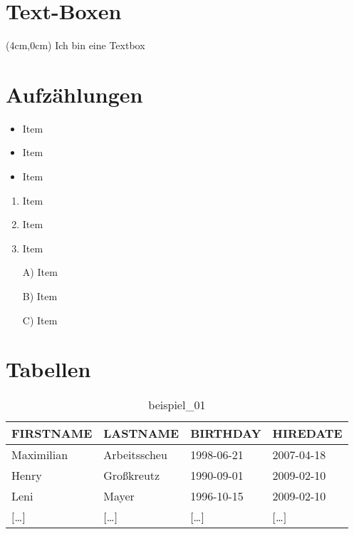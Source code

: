 \section{Text-Boxen}
\begin{textblock*}{\textwidth}(4cm,0cm)
  Ich bin eine Textbox
\end{textblock*}


\section{Aufzählungen}
\begin{itemize}[itemsep=0pt]
  \item Item
  \item Item
  \item Item
\end{itemize}

\begin{enumerate}[itemsep=0pt]
  \item Item
  \item Item
  \item Item
\end{enumerate}

\begin{itemize}[itemsep=0pt]
  \item[A)] Item
  \item[B)] Item
  \item[C)] Item
\end{itemize}

\section{Tabellen}

\begin{table}[H]
  \begin{tabularx}{\textwidth}{X|X|X|X}
    \textbf{FIRSTNAME} & \textbf{LASTNAME} & \textbf{BIRTHDAY} & \textbf{HIREDATE} \\
    \hline\hline
    Maximilian & Arbeitsscheu & 1998-06-21 & 2007-04-18 \\
    Henry & Großkreutz & 1990-09-01 & 2009-02-10 \\
    Leni & Mayer & 1996-10-15 & 2009-02-10 \\
    $[$\dots$]$ & $[$\dots$]$ & $[$\dots$]$ & $[$\dots$]$ \\
  \end{tabularx}
  \caption{beispiel\_01}
  \label{tbl:beispiel_01}
\end{table}

